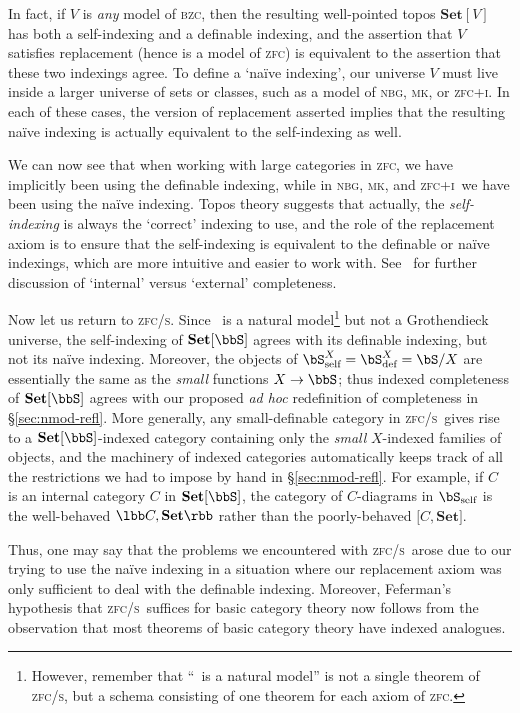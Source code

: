 \documentclass[12pt]{amsart}
\newcommand{\Set}{\ensuremath{\mathbf{Set}}}
\def\zfc{\textsc{zfc}}
\def\zfci{\textsc{zfc+i}}
\def\zfcs{\textsc{zfc/s}}
\def\nbg{\textsc{nbg}}
\def\mk{\textsc{mk}}
\def\bzc{\textsc{bzc}}
\begin{document}
In fact, if $V$ is \emph{any} model of \bzc, then the resulting
well-pointed topos $\Set[V]$ has both a self-indexing and a definable
indexing, and the assertion that $V$ satisfies replacement (hence is a
model of \zfc) is equivalent to the assertion that these two indexings
agree.  To define a `na\"ive indexing', our universe $V$ must live
inside a larger universe of sets or classes, such as a model of \nbg,
\mk, or \zfci.  In each of these cases, the version of replacement
asserted implies that the resulting na\"ive indexing is actually
equivalent to the self-indexing as well.

We can now see that when working with large categories in \zfc, we
have implicitly been using the definable indexing, while in \nbg, \mk,
and \zfci\ we have been using the na\"ive indexing.  Topos theory
suggests that actually, the \emph{self-indexing} is always the
`correct' indexing to use, and the role of the replacement axiom is to
ensure that the self-indexing is equivalent to the definable or
na\"ive indexings, which are more intuitive and easier to work with.
See~\cite[\S 17]{streicher:fibredcats} for further discussion of
`internal' versus `external' completeness.

Now let us return to \zfcs.  Since \bbS\ is a natural
model\footnote{However, remember that ``\bbS\ is a natural model'' is
  not a single theorem of \zfcs, but a schema consisting of one
  theorem for each axiom of \zfc.} but not a Grothendieck universe,
the self-indexing of $\Set[\bbS]$ agrees with its definable indexing,
but not its na\"ive indexing.  Moreover, the objects of
$\bS^X_{\text{self}} = \bS^X_{\text{def}}=\bS/X$ are essentially the
same as the \emph{small} functions $X\to\bbS$; thus indexed
completeness of $\Set[\bbS]$ agrees with our proposed \emph{ad hoc}
redefinition of completeness in \S\ref{sec:nmod-refl}.  More
generally, any small-definable category in \zfcs\ gives rise to a
$\Set[\bbS]$-indexed category containing only the \emph{small}
$X$-indexed families of objects, and the machinery of indexed
categories automatically keeps track of all the restrictions we had to
impose by hand in \S\ref{sec:nmod-refl}.  For example, if $C$ is an
internal category $C$ in $\Set[\bbS]$, the category of $C$-diagrams in
$\bS_{\text{self}}$ is the well-behaved $\lbb C,\Set\rbb$ rather
than the poorly-behaved $\pmb[C,\Set\pmb]$.

Thus, one may say that the problems we encountered with \zfcs\ arose
due to our trying to use the na\"ive indexing in a situation where our
replacement axiom was only sufficient to deal with the definable
indexing.  Moreover, Feferman's hypothesis that \zfcs\ suffices for
basic category theory now follows from the observation that most
theorems of basic category theory have indexed analogues.
\end{document}

